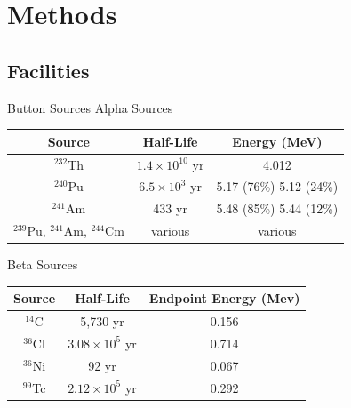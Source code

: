 
% 
%
\section{Methods}


\subsection{Facilities}
\begin{frame}{Button Sources}
	\centering
	Alpha Sources
	\begin{table}[h]
		\tiny
		\begin{tabular}{c | c c}
		Source & Half-Life & Energy (MeV) \\
		\hline
		\hline
		${}^{232}$Th & $1.4\times10^{10}$ yr & 4.012 \\
		${}^{240}$Pu & $6.5\times10^{3}$ yr & 5.17 (76\%) 5.12 (24\%) \\
		${}^{241}$Am & 433 yr & 5.48 (85\%) 5.44 (12\%) \\
		${}^{239}$Pu, ${}^{241}$Am, ${}^{244}$Cm  & various & various \\
		\hline
		\end{tabular}
	\end{table}
	Beta Sources
	\begin{table}[h]
		\tiny
		\begin{tabular}{c | c c}
		Source & Half-Life & Endpoint Energy (Mev)\\
		\hline
		\hline
		${}^{14}$C &  5,730 yr & 0.156 \\
		${}^{36}$Cl & $3.08\times10^{5}$ yr & 0.714 \\
		${}^{36}$Ni &  92 yr & 0.067 \\
		${}^{99}$Tc & $2.12\times10^{5}$ yr & 0.292 \\
		\hline
		\end{tabular}
	\end{table}
\end{frame}

